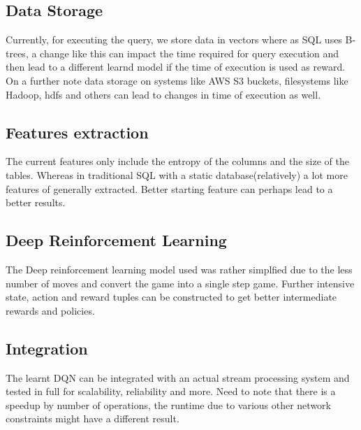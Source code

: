 \subsection{Data Storage}
Currently, for executing the query, we store data in vectors where as SQL uses B-trees, a change like this can impact the time required for query execution and then lead to a different learnd model if the time of execution is used as reward.\\
On a further note data storage on systems like AWS S3 buckets, filesystems like Hadoop, hdfs and others can lead to changes in time of execution as well.

\subsection{Features extraction}
The current features only include the entropy of the columns and the size of the tables. Whereas in traditional SQL with a static database(relatively) a lot more features of generally extracted. Better starting feature can perhaps lead to a better results. 

\subsection{Deep Reinforcement Learning}
The Deep reinforcement learning model used was rather simplfied due to the less number of moves and convert the game into a single step game. Further intensive state, action and reward tuples can be constructed to get better intermediate rewards and policies. 

\subsection{Integration} 
The learnt DQN can be integrated with an actual stream processing system and tested in full for scalability, reliability and more. Need to note that there is a speedup by number of operations, the runtime due to various other network constraints might have a different result. 
